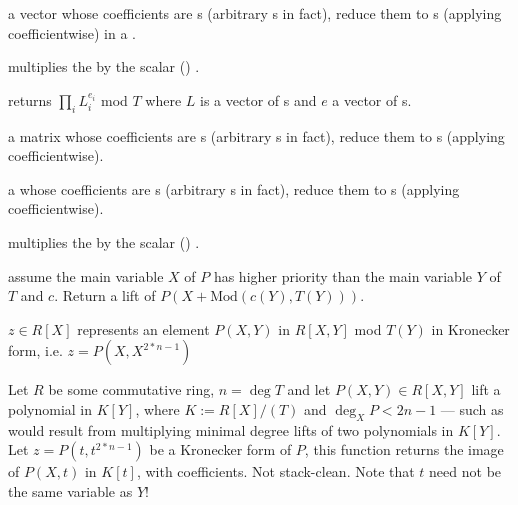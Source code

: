   a vector whose
coefficients are s (arbitrary s in fact), reduce them to
s (applying  coefficientwise) in a .

  multiplies the
   by the scalar () .

 returns
$\prod_i L_i^{e_i}$ mod $T$ where $L$ is a vector of s and
$e$ a vector of s.


  a matrix whose
coefficients are s (arbitrary s in fact), reduce them to
s (applying  coefficientwise).



  a  whose
coefficients are s (arbitrary s in fact), reduce them to
s (applying  coefficientwise).


 multiplies the 
 by the scalar () .






 assume the main variable
$X$ of $P$ has higher priority than the main variable $Y$ of $T$ and $c$.
Return a lift of $P(X+\text{Mod}(c(Y), T(Y)))$.

 $z\in R[X]$ represents an element
$P(X,Y)$ in $R[X,Y]$ mod $T(Y)$ in Kronecker form, i.e. $z = P(X,X^{2*n-1})$

Let $R$ be some commutative ring, $n = \deg T$ and let $P(X,Y)\in R[X,Y]$ lift
a polynomial in $K[Y]$, where $K := R[X]/(T)$ and $\deg_X P < 2n-1$ --- such as
would result from multiplying minimal degree lifts of two polynomials in
$K[Y]$. Let $z = P(t,t^{2*n-1})$ be a Kronecker form of $P$, this function
returns the image of $P(X,t)$ in $K[t]$, with  coefficients.
Not stack-clean. Note that $t$ need not be the same variable as $Y$!

